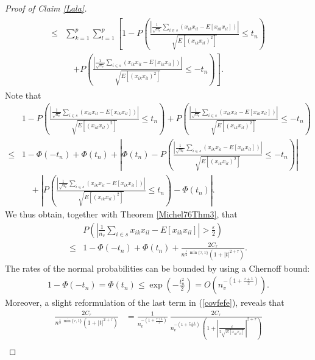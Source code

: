 \documentclass[Research_Module_ES.tex]{subfiles}
\begin{document}
\begin{proof}[Proof of Claim \ref{Lala}]
\begin{align}
\begin{split}\label{dreieck}
\leq&\sum_{k=1}^{p}\sum_{l=1}^{p}\left[ 1-P\left( \frac{\left|\frac{1}{\sqrt{n_v}}\sum_{i\in s}\left(x_{ik}x_{il}-E[x_{ik}x_{il}]\right)\right|}{\sqrt{E[(x_{ik}x_{il})^2]}}\leq t_n \right) \right.\\
&\quad\left. + P\left( \frac{\left|\frac{1}{\sqrt{n_v}}\sum_{i\in s}\left(x_{ik}x_{il}-E[x_{ik}x_{il}]\right)\right|}{\sqrt{E[(x_{ik}x_{il})^2]}}\leq -t_n \right) \right].
\end{split}
\end{align}
Note that
\begin{align*}
 &1-P\left( \frac{\left|\frac{1}{\sqrt{n_v}}\sum_{i\in s}\left(x_{ik}x_{il}-E[x_{ik}x_{il}]\right)\right|}{\sqrt{E[(x_{ik}x_{il})^2]}}\leq t_n \right) + P\left( \frac{\left|\frac{1}{\sqrt{n_v}}\sum_{i\in s}\left(x_{ik}x_{il}-E[x_{ik}x_{il}]\right)\right|}{\sqrt{E[(x_{ik}x_{il})^2]}}\leq -t_n \right) \\
 \leq&1-\Phi(-t_n)+\Phi(t_n)+\left| \Phi(t_n)-P\left( \frac{\left|\frac{1}{\sqrt{n_v}}\sum_{i\in s}\left(x_{ik}x_{il}-E[x_{ik}x_{il}]\right)\right|}{\sqrt{E[(x_{ik}x_{il})^2]}}\leq -t_n\right) \right|\\
 &\quad+ \left|P\left(\frac{\left|\frac{1}{\sqrt{n_v}}\sum_{i\in s}\left(x_{ik}x_{il}-E[x_{ik}x_{il}]\right)\right|}{\sqrt{E[(x_{ik}x_{il})^2]}} \leq t_n\right) -\Phi(t_n)\right|.
\end{align*}
We thus obtain, together with Theorem \ref{Michel76Thm3}, that
\begin{align}
&P\left(\left| \frac{1}{n_v}\sum_{i\in s}x_{ik}x_{il}-E[x_{ik} x_{il}] \right|>\frac{\varepsilon}{2}\right)\\
\leq&1-\Phi(-t_n)+\Phi(t_n)+\frac{2C_\tau}{n^{\frac{1}{2}~ \min\{\tau,1\}} (1+|t|^{2+\tau}) }.\label{covfefe}
\end{align}
The rates of the normal probabilities can be bounded by using a Chernoff bound:
\begin{align*}
1-\Phi(-t_n)=\Phi(t_n)\leq\exp\left(-\frac{t_n^2}{2}\right)=O\left(n_v^{-\left(1+\frac{\tau+1}{2}\right)}\right).
\end{align*}
Moreover, a slight reformulation of the last term in (\ref{covfefe}), reveals that
\begin{align*}
\frac{2C_\tau}{n^{\frac{1}{2}~ \min\{\tau,1\}} (1+|t|^{2+\tau}) }&=\frac{1}{n_v^{-\left(1+\frac{\tau+1}{2}\right)}}~\frac{2C_\tau}{n_v^{-\left( 1+\frac{\tau+1}{2} \right)} ~\left(1+\left|  \frac{\varepsilon}{2\sqrt{E[x_{ik}x_{il}]}} \right|^{2+\tau}\right)  }\\

\end{align*}
\end{proof}
\end{document}
